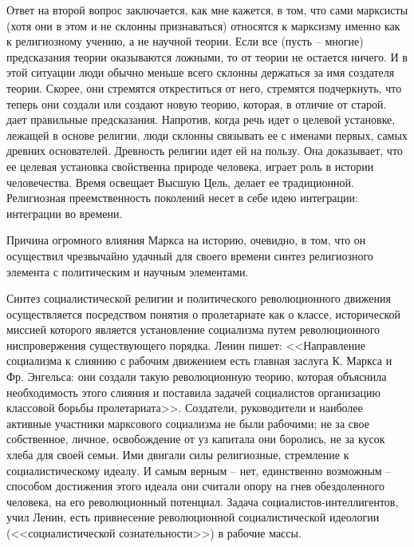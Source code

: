 \documentclass{book}
\begin{document}
Ответ на второй вопрос заключается, как мне кажется, в том, что сами марксисты (хотя они в этом и не склонны признаваться) относятся к марксизму именно как к религиозному учению,  а не научной теории. Если все (пусть -- многие) предсказания теории оказываются ложными, то от теории не остается ничего. И в этой ситуации люди обычно меньше всего склонны держаться за имя создателя теории. Скорее, они стремятся откреститься от него, стремятся подчеркнуть, что теперь они создали или создают новую  теорию, которая, в отличие от старой. дает правильные предсказания. Напротив, когда речь идет о целевой установке, лежащей в основе религии, люди склонны связывать ее с именами первых, самых древних основателей. Древность религии идет ей на пользу. Она доказывает, что ее целевая установка свойственна природе человека, играет роль в истории человечества. Время освещает Высшую Цель, делает ее традиционной. Религиозная преемственность поколений несет в себе идею интеграции: интеграции во времени.

Причина огромного влияния Маркса на историю, очевидно, в том, что он осуществил чрезвычайно удачный для своего вре­мени синтез религиозного элемента с политическим и научным элементами.

Синтез социалистической религии и политического революционного движения осуществляется посредством понятия о пролетариате как о классе, исторической миссией которого является установление социализма путем революционного ниспровержения существующего порядка. Ленин пишет: <<Направ­ление социализма к слиянию с рабочим движением есть главная заслуга К. Маркса и Фр. Энгельса: они создали такую револю­ционную теорию, которая объяснила необходимость этого слия­ния и поставила задачей социалистов организацию классовой борьбы пролетариата>>. Создатели, руководители и наиболее активные участники марксового социализма не были рабочими; не за свое собственное, личное, освобождение от уз капитала они боролись, не за кусок хлеба для своей семьи. Ими двигали силы религиозные, стремление к социалистическому иде­алу. И самым верным -- нет, единственно возможным -- способом достижения этого идеала они считали опору на гнев обездоленного человека, на его революционный потенциал. Задача социалистов-интеллигентов, учил Ленин, 
есть 
привнесение революционной социалистической идеологии (<<социалистической сознательности>>) в рабочие массы.
\end{document}
